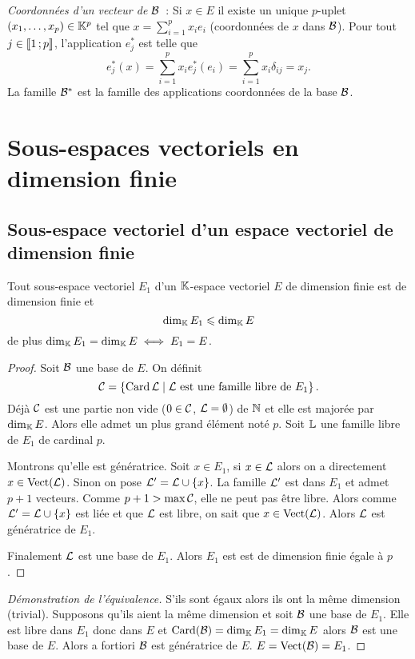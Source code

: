 \emph{Coordonnées d'un vecteur de \(\mathcal{B}\)}~: Si \(x \in E\) il existe un unique 
\(p\)-uplet \((x_1, \ldots, x_p) \in \mathbb{K}^p\) tel que \(x = \sum_{i=1}^p x_i e_i\) 
(coordonnées de \(x\) dans \(\mathcal{B}\)). Pour tout \(j \in  
\mathopen{\llbracket}1\mathclose{}\mathpunct{};p\mathclose{\rrbracket}\), l'application \(e_j^*\) est telle que
\begin{equation}
  e_j^*(x)=\sum_{i=1}^p x_i e_j^*(e_i) = \sum_{i=1}^p x_i \delta_{ij} = x_j.
\end{equation}
La famille \(\mathcal{B}^*\) est la famille des applications coordonnées de la base 
\(\mathcal{B}\).

\section{Sous-espaces vectoriels en dimension finie}

\subsection{Sous-espace vectoriel d'un espace vectoriel de dimension finie}

\begin{theo}
  Tout sous-espace vectoriel \(E_1\) d'un \(\mathbb{K}\)-espace vectoriel \(E\) de 
  dimension finie est de dimension finie et
  \begin{equation}
    \operatorname{dim}_{\mathbb{K}} E_1 \leqslant \operatorname{dim}_{\mathbb{K}} E
  \end{equation}
  de plus \(\operatorname{dim}_{\mathbb{K}} E_1 = \operatorname{dim}_{\mathbb{K}} E \iff E_1 =E\).
\end{theo}
\begin{proof}
  Soit \(\mathcal{B}\) une base de \(E\). On définit \begin{equation}
  \mathcal{C}=\left\{\operatorname{Card} \mathcal{L}\mathrel{}\middle|\mathrel{}\mathcal{L} \text{~est une famille libre de } E_1\right\}. 
  \end{equation}
  Déjà \(\mathcal{C}\) est une partie non vide (\(0 \in \mathcal{C}\), 
  \(\mathcal{L}=\emptyset\)) de \(\mathbb{N}\) et elle est majorée par \(\operatorname{dim}_{\mathbb{K}} E\). Alors elle 
  admet un plus grand élément noté \(p\). Soit \(\mathbb{L}\) une famille libre de 
  \(E_1\) de cardinal \(p\). 

  Montrons qu'elle est génératrice. Soit \(x \in E_1\), si \(x \in \mathcal{L}\) alors 
  on a directement \(x \in \operatorname{Vect}(\mathcal{L})\). Sinon on pose \(\mathcal{L}' = \mathcal{L} \cup 
  \{x\}\). La famille \(\mathcal{L}'\) est dans \(E_1\) et admet \(p+1\) vecteurs. Comme 
  \(p+1 > \max \mathcal{C}\), elle ne peut pas être libre. Alors comme \(\mathcal{L}' 
  =\mathcal{L}\cup\{x\}\) est liée et que \(\mathcal{L}\) est libre, on sait que \(x \in 
  \operatorname{Vect}(\mathcal{L})\). Alors \(\mathcal{L}\) est génératrice de \(E_1\).

  Finalement \(\mathcal{L}\) est une base de \(E_1\). Alors \(E_1\) est est de dimension 
  finie égale à \(p\).
\end{proof}
\begin{proof}[Démonstration de l'équivalence]
  S'ils sont égaux alors ils ont la même dimension (trivial). Supposons qu'ils 
  aient la même dimension et soit \(\mathcal{B}\) une base de \(E_1\). Elle est libre 
  dans \(E_1\) donc dans \(E\) et \(\operatorname{Card}(\mathcal{B})=\operatorname{dim}_{\mathbb{K}} E_1=\operatorname{dim}_{\mathbb{K}} E\) alors 
  \(\mathcal{B}\) est une base de \(E\). Alors a fortiori \(\mathcal{B}\) est génératrice de 
  \(E\). \(E=\operatorname{Vect}(\mathcal{B})=E_1\).
\end{proof}

